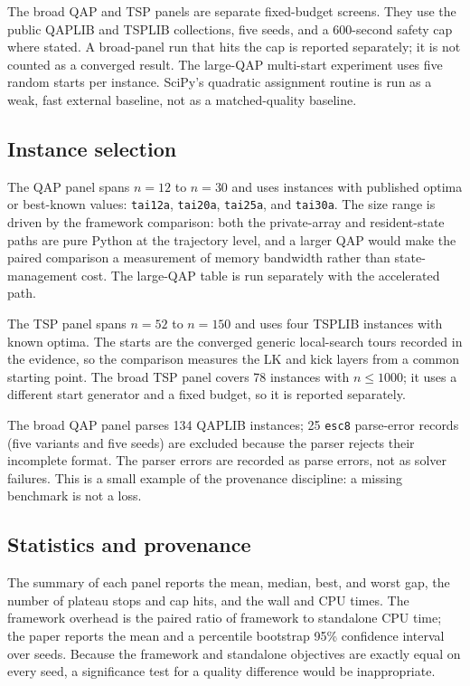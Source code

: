 \documentclass[11pt]{article}
\begin{document}
The broad QAP and TSP panels are separate fixed-budget screens. They use the public QAPLIB and TSPLIB
collections, five seeds, and a 600-second safety cap where stated. A broad-panel run that hits the cap
is reported separately; it is not counted as a converged result. The large-QAP multi-start experiment
uses five random starts per instance. SciPy's quadratic assignment routine
\citep{virtanen2020} is run as a weak, fast external baseline, not as a matched-quality baseline.

\subsection{Instance selection}

The QAP panel spans $n=12$ to $n=30$ and uses instances with published optima or best-known values:
\texttt{tai12a}, \texttt{tai20a}, \texttt{tai25a}, and \texttt{tai30a}. The size range is driven by
the framework comparison: both the private-array and resident-state paths are pure Python at the
trajectory level, and a larger QAP would make the paired comparison a measurement of memory bandwidth
rather than state-management cost. The large-QAP table is run separately with the accelerated path.

The TSP panel spans $n=52$ to $n=150$ and uses four TSPLIB instances with known optima. The starts are
the converged generic local-search tours recorded in the evidence, so the comparison measures the LK and kick layers
from a common starting point. The broad TSP panel covers 78 instances with $n\le1000$; it uses a
different start generator and a fixed budget, so it is reported separately.

The broad QAP panel parses 134 QAPLIB instances; 25 \texttt{esc8} parse-error records (five variants and five seeds) are excluded because the
parser rejects their incomplete format. The parser errors are recorded as parse errors, not as solver
failures. This is a small example of the provenance discipline: a missing benchmark is not a loss.

\subsection{Statistics and provenance}

The summary of each panel reports the mean, median, best, and worst gap, the number of plateau stops
and cap hits, and the wall and CPU times. The framework overhead is the paired ratio of framework to
standalone CPU time; the paper reports the mean and a percentile bootstrap 95\% confidence interval
over seeds. Because the framework and standalone objectives are exactly equal on every seed, a
significance test for a quality difference would be inappropriate.
\end{document}
